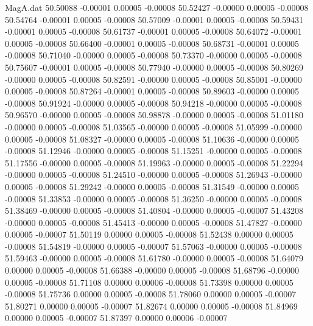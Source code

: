 \begin{filecontents}{MagA.dat}
  50.50088   -0.00001    0.00005   -0.00008
  50.52427   -0.00000    0.00005   -0.00008
  50.54764   -0.00001    0.00005   -0.00008
  50.57009   -0.00001    0.00005   -0.00008
  50.59431   -0.00001    0.00005   -0.00008
  50.61737   -0.00001    0.00005   -0.00008
  50.64072   -0.00001    0.00005   -0.00008
  50.66400   -0.00001    0.00005   -0.00008
  50.68731   -0.00001    0.00005   -0.00008
  50.71040   -0.00000    0.00005   -0.00008
  50.73370   -0.00000    0.00005   -0.00008
  50.75607   -0.00001    0.00005   -0.00008
  50.77940   -0.00000    0.00005   -0.00008
  50.80269   -0.00000    0.00005   -0.00008
  50.82591   -0.00000    0.00005   -0.00008
  50.85001   -0.00000    0.00005   -0.00008
  50.87264   -0.00001    0.00005   -0.00008
  50.89603   -0.00000    0.00005   -0.00008
  50.91924   -0.00000    0.00005   -0.00008
  50.94218   -0.00000    0.00005   -0.00008
  50.96570   -0.00000    0.00005   -0.00008
  50.98878   -0.00000    0.00005   -0.00008
  51.01180   -0.00000    0.00005   -0.00008
  51.03565   -0.00000    0.00005   -0.00008
  51.05999   -0.00000    0.00005   -0.00008
  51.08327   -0.00000    0.00005   -0.00008
  51.10636   -0.00000    0.00005   -0.00008
  51.12946   -0.00000    0.00005   -0.00008
  51.15251   -0.00000    0.00005   -0.00008
  51.17556   -0.00000    0.00005   -0.00008
  51.19963   -0.00000    0.00005   -0.00008
  51.22294   -0.00000    0.00005   -0.00008
  51.24510   -0.00000    0.00005   -0.00008
  51.26943   -0.00000    0.00005   -0.00008
  51.29242   -0.00000    0.00005   -0.00008
  51.31549   -0.00000    0.00005   -0.00008
  51.33853   -0.00000    0.00005   -0.00008
  51.36250   -0.00000    0.00005   -0.00008
  51.38469   -0.00000    0.00005   -0.00008
  51.40804   -0.00000    0.00005   -0.00007
  51.43208   -0.00000    0.00005   -0.00008
  51.45413   -0.00000    0.00005   -0.00008
  51.47827   -0.00000    0.00005   -0.00007
  51.50119    0.00000    0.00005   -0.00008
  51.52438    0.00000    0.00005   -0.00008
  51.54819   -0.00000    0.00005   -0.00007
  51.57063   -0.00000    0.00005   -0.00008
  51.59463   -0.00000    0.00005   -0.00008
  51.61780   -0.00000    0.00005   -0.00008
  51.64079    0.00000    0.00005   -0.00008
  51.66388   -0.00000    0.00005   -0.00008
  51.68796   -0.00000    0.00005   -0.00008
  51.71108    0.00000    0.00006   -0.00008
  51.73398    0.00000    0.00005   -0.00008
  51.75736    0.00000    0.00005   -0.00008
  51.78060    0.00000    0.00005   -0.00007
  51.80271    0.00000    0.00005   -0.00007
  51.82674    0.00000    0.00005   -0.00008
  51.84969    0.00000    0.00005   -0.00007
  51.87397    0.00000    0.00006   -0.00007

\end{filecontents}
